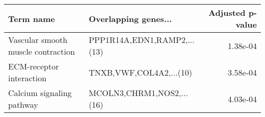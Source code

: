 \begin{tabular}{llr}
\toprule
                         Term name &        Overlapping genes... &  Adjusted p-value \\
\midrule
Vascular smooth muscle contraction & PPP1R14A,EDN1,RAMP2,...(13) &          1.38e-04 \\
          ECM-receptor interaction &     TNXB,VWF,COL4A2,...(10) &          3.58e-04 \\
         Calcium signaling pathway &   MCOLN3,CHRM1,NOS2,...(16) &          4.03e-04 \\
\bottomrule
\end{tabular}
